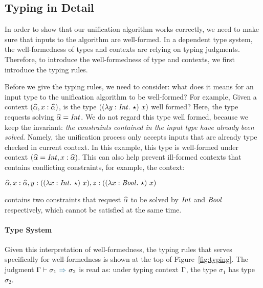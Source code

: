 \subsection{Typing in Detail}
\label{subsec:typing}

\begin{figure*}[t]

    \caption{Typing and semantics.}
    \label{fig:typing}
\end{figure*}

In order to show that our unification algorithm works correctly, we need to make
sure that inputs to the algorithm are well-formed.
In a dependent type system, the well-formedness of types and contexts are relying
on typing judgments.
Therefore, to introduce the well-formedness of type and contexts,
we first introduce the typing rules.

Before we give the typing rules, we need to consider: what does it
means for an input type to the unification algorithm to be well-formed?
For example, Given a context $(\widehat{\alpha}, x : \widehat{\alpha})$,
is the type $((\lambda y:\mathit{Int}.~ \star) ~ x)$ well formed?
Here, the type requests solving $\widehat{\alpha} = \mathit{Int}$.
We do not regard this type well formed, because we keep the
invariant: \textit{the
constraints contained in the input type have already been solved.}
Namely, the unification process only accepts inputs that are already type
checked in current context.
In this example, this type is well-formed under context
$(\widehat{\alpha} = \mathit{Int}, x : \widehat{\alpha})$.
This can also help prevent ill-formed contexts that contains conflicting
constraints, for example, the context:

$\widehat{\alpha}, x: \widehat{\alpha}, y : ((\lambda x:\mathit{Int}.~ \star)~x), z : ((\lambda x:\mathit{Bool}.~ \star)~x)$

\noindent contains two constraints that request $\widehat{\alpha}$ to be solved by $\mathit{Int}$
and $\mathit{Bool}$ respectively, which cannot be satisfied at the same time.

\paragraph{Type System}
Given this interpretation of well-formedness, the typing rules that serves
specifically for well-formedness is shown at the top of Figure~\ref{fig:typing}.
The judgment $\tctx \byinf \sigma_1 \infto \sigma_2$ is read as: under typing
context $\Gamma$, the type $\sigma_1$ has type $\sigma_2$.

